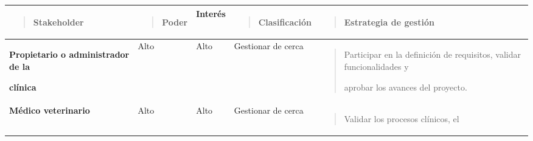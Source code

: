 \documentclass[
]{article}
\newcounter{none} %
\begin{document}
{\def\LTcaptype{none} %
\begin{longtable}[]{@{}
  >{\raggedright\arraybackslash}p{}
  >{\raggedright\arraybackslash}p{}
  >{\raggedright\arraybackslash}p{}
  >{\raggedright\arraybackslash}p{}
  >{\raggedright\arraybackslash}p{}@{}}
\toprule\noalign{}
\begin{minipage}[b]{\linewidth}\raggedright
\begin{quote}
\textbf{Stakeholder}
\end{quote}
\end{minipage} & \begin{minipage}[b]{\linewidth}\raggedright
\begin{quote}
\textbf{Poder}
\end{quote}
\end{minipage} & \begin{minipage}[b]{\linewidth}\raggedright
\textbf{Interés}
\end{minipage} & \begin{minipage}[b]{\linewidth}\raggedright
\begin{quote}
\textbf{Clasificación}
\end{quote}
\end{minipage} & \begin{minipage}[b]{\linewidth}\raggedright
\begin{quote}
\textbf{Estrategia de gestión}
\end{quote}
\end{minipage} \\
\midrule\noalign{}
\endhead
\bottomrule\noalign{}
\endlastfoot
\textbf{Propietario o administrador de la}

\textbf{clínica} & Alto & Alto & Gestionar de cerca &
\begin{minipage}[t]{\linewidth}\raggedright
\begin{quote}
Participar en la definición de requisitos, validar funcionalidades y

aprobar los avances del proyecto.
\end{quote}
\end{minipage} \\
\textbf{Médico veterinario} & Alto & Alto & Gestionar de cerca &
\begin{minipage}[t]{\linewidth}\raggedright
\begin{quote}
Validar los procesos clínicos, el


\end{quote}
\end{minipage}
\end{longtable}}
\end{document}
